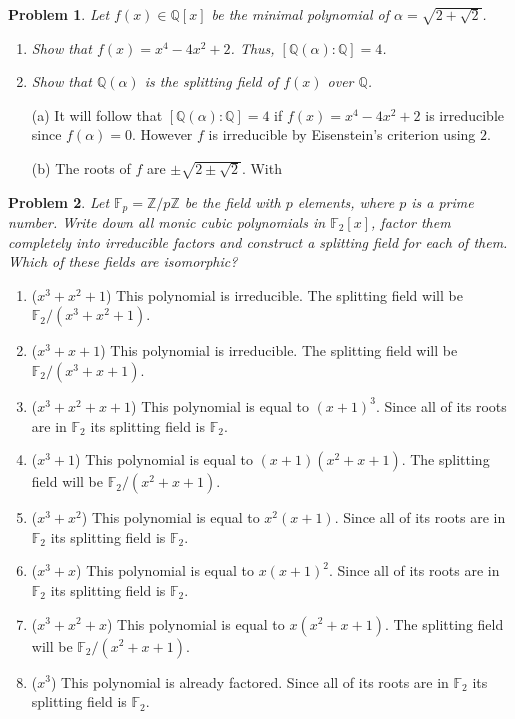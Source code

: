 \documentclass[10pt]{article}
\newcommand{\sk}{\vskip 10mm}
\newcommand{\bb}[1]{\mathbb{#1}}
\theoremstyle{plain}
\newtheorem{problem}{Problem}
\theoremstyle{remark}
\begin{document}
\begin{problem}
  Let $f(x) \in \mathbb{Q}[x]$ be the minimal polynomial of $\alpha = \sqrt{2 + \sqrt{2}}$.
\begin{enumerate}
    \item Show that $f(x) = x^4 - 4x^2 + 2$. Thus, $[\mathbb{Q}(\alpha): \mathbb{Q}] = 4$.
    \item Show that $\mathbb{Q}(\alpha)$ is the splitting field of $f(x)$ over $\mathbb{Q}$.
\end{enumerate}
\end{problem}

\begin{itemize}
\item[(a)] It will follow that $[\bb{Q}(\alpha):\bb{Q}]=4$ if
  $f(x)=x^4-4x^2+2$ is irreducible since $f(\alpha)=0$. However
  $f$ is irreducible by Eisenstein's criterion using $2$.
\item[(b)] The roots of $f$ are $\pm\sqrt{2\pm\sqrt{2}}$. With
\end{itemize}

\sk

\begin{problem}
  Let $\mathbb{F}_p = \mathbb{Z}/p\mathbb{Z}$ be the field with $p$
  elements, where $p$ is a prime number. Write down all monic cubic
  polynomials in $\mathbb{F}_2[x]$, factor them completely into
  irreducible factors and construct a splitting field for each
  of them. Which of these fields are isomorphic?
\end{problem}

\begin{enumerate}
\item ($x^3+x^2+1$) This polynomial is irreducible. The splitting field will be $\bb{F}_2/(x^3+x^2+1)$.
\item ($x^3+x+1$) This polynomial is irreducible. The splitting field will be $\bb{F}_2/(x^3+x+1)$.
\item ($x^3+x^2+x+1$) This polynomial is equal to $(x+1)^3$. Since all of its roots
  are in $\bb{F}_2$ its splitting field is $\bb{F}_2$.
\item ($x^3+1$) This polynomial is equal to $(x+1)(x^2+x+1)$. The splitting field will be $\bb{F}_2/(x^2+x+1)$.
\item ($x^3+x^2$) This polynomial is equal to $x^2(x+1)$. Since all of its roots
  are in $\bb{F}_2$ its splitting field is $\bb{F}_2$.
\item ($x^3+x$) This polynomial is equal to $x(x+1)^2$. Since all of its roots
  are in $\bb{F}_2$ its splitting field is $\bb{F}_2$.
\item ($x^3+x^2+x$) This polynomial is equal to $x(x^2+x+1)$. The splitting field will be $\bb{F}_2/(x^2+x+1)$.
\item ($x^3$) This polynomial is already factored. Since all of its roots
  are in $\bb{F}_2$ its splitting field is $\bb{F}_2$.
\end{enumerate}
\end{document}
